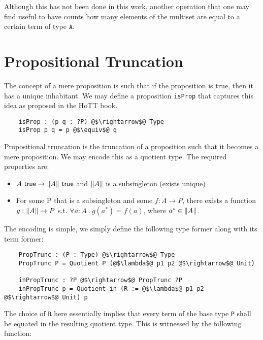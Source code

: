 \documentclass[12pt,twoside,maitrise]{dms}
\theoremstyle{definition}
\numberwithin{equation}{section}
\numberwithin{table}{chapter}
\numberwithin{figure}{chapter}
\DeclarePairedDelimiter{\norm}{\lVert}{\rVert}
\newcommand\kw[1] {\textsf{#1}}
\newcommand\id[1] {\texttt{#1}}
\newcommand\fn[1] {\texttt{#1}}
\begin{document}
Although this has not been done in this work, another operation that one may find
useful to have counts how many elements of the multiset are equal to
a certain term of type $\fn{A}$.

\section{Propositional Truncation}\label{sec:prop-trunc}

The concept of a mere proposition is such that if the proposition is true, then
it has a unique inhabitant. We may define a proposition \id{isProp} that
captures this idea as proposed in the HoTT book\cite[Chap~3.3]{HoTTbook}.

\begin{verbatim}
    isProp : (p q : ?P) @$\rightarrow$@ Type
    isProp p q = p @$\equiv$@ q
\end{verbatim}

Propositional truncation is the truncation of a proposition such that it becomes
a mere proposition. We may encode this as a quotient type. The required properties
are:

\begin{itemize}
	\item $A \ \kw{true} \rightarrow \norm{A} \ \kw{true}$ and $\norm{A}$
      is a subsingleton (exists unique)
	\item For some P that is a subsingleton and some $f : A \rightarrow P$, there exists a function $g : \norm{A} \rightarrow P$ s.t. $ \forall a : A \ . \ g(a^*) = f(a)$, where $a^* \in \norm{A}$.
\end{itemize}

The encoding is simple, we simply define the following type former along with its term former:

\begin{verbatim}
    PropTrunc : (P : Type) @$\rightarrow$@ Type
    PropTrunc P = Quotient P (@$\lambda$@ p1 p2 @$\rightarrow$@ Unit)

    inPropTrunc : ?P @$\rightarrow$@ PropTrunc ?P
    inPropTrunc p = Quotient_in (R := @$\lambda$@ p1 p2 @$\rightarrow$@ Unit) p
\end{verbatim}

The choice of $\id{R}$ here essentially implies that every term of the base type
\id{P} shall be equated in the resulting quotient type. This is witnessed by
the following function:
\end{document}
